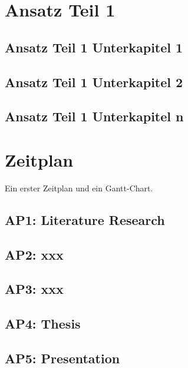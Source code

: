 \documentclass[10pt]{book}
\begin{document}
\chapter{Ansatz Teil 1}\label{chp:Approach1}
  \section{Ansatz Teil 1 Unterkapitel 1}
    \blindtext
  \section{Ansatz Teil 1 Unterkapitel 2}
    \blindtext
  \section{Ansatz Teil 1 Unterkapitel n}
    \blindtext

\chapter{Zeitplan}\label{chp:Schedule}
  Ein erster Zeitplan und ein Gantt-Chart.
  \section{AP1: Literature Research}
  	\blindtext
  \section{AP2: xxx}
	\blindtext
  \section{AP3: xxx}
    \blindtext
  \section{AP4: Thesis}
    \blindtext
  \section{AP5: Presentation}
	\blindtext
\end{document}
